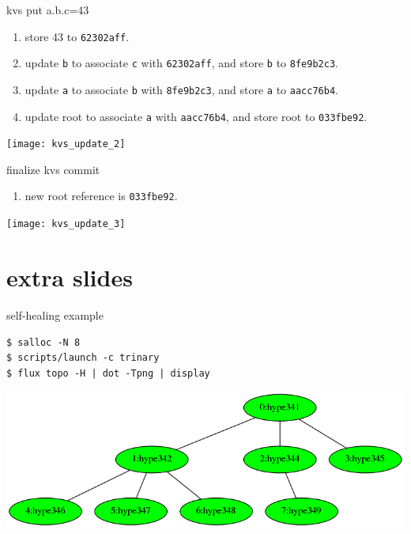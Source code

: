 \documentclass[default,pdf,colorBG,slideColor]{prosper}
\begin{document}
\begin{slide}{kvs put a.b.c=43}{\small
\begin{minipage}{0.50\textwidth}
\begin{enumerate}
\item{store 43 to {\tt 62302aff}.}
\item{update {\tt b} to associate {\tt c} with {\tt 62302aff}, and store {\tt b} to {\tt 8fe9b2c3}.}
\item{update {\tt a} to associate {\tt b} with {\tt 8fe9b2c3}, and store {\tt a} to {\tt aacc76b4}.}
\item{update root to associate {\tt a} with {\tt aacc76b4}, and store root to {\tt 033fbe92}.}
\end{enumerate}
\end{minipage}
\begin{minipage}[t]{0.50\textwidth}
\begin{center}
  \texttt{[image: kvs\_update\_2]}
\end{center}
\end{minipage}
}\end{slide}

\begin{slide}{finalize kvs commit}{\small
\begin{minipage}{0.50\textwidth}
\begin{enumerate}
\item{new root reference is {\tt 033fbe92}.}
\end{enumerate}
\end{minipage}
\begin{minipage}[t]{0.50\textwidth}
\begin{center}
  \texttt{[image: kvs\_update\_3]}
\end{center}
\end{minipage}
}\end{slide}

\part{extra slides}

\begin{slide}{self-healing example}{\tiny
\begin{verbatim}
$ salloc -N 8
$ scripts/launch -c trinary
$ flux topo -H | dot -Tpng | display
\end{verbatim}
\begin{center}
  \includegraphics[scale=1]{8tri-ok}
\end{center}
}\end{slide}
\end{document}
